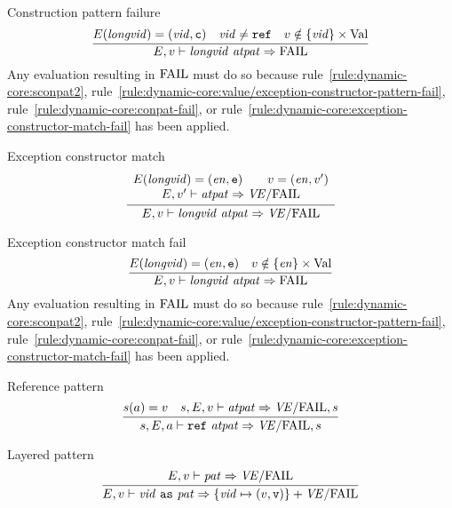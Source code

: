 \begin{inference-rule}{Construction pattern failure}
\begin{equation}\label{rule:dynamic-core:conpat-fail}
\vcenter{\infer{\E,\V\ts\vidpat\ra \FAIL}
  {\E(\longvid) = (\vid,\isc)
    & \vid\neq\REF
    & \V\notin\{\vid\}\times\Val}}
\end{equation}
Any evaluation resulting in ${\rm FAIL}$ must do so because 
rule~\ref{rule:dynamic-core:sconpat2},
rule~\ref{rule:dynamic-core:value/exception-constructor-pattern-fail},
rule~\ref{rule:dynamic-core:conpat-fail},
or rule~\ref{rule:dynamic-core:exception-constructor-match-fail}
has been applied.
\end{inference-rule}

\begin{inference-rule}{Exception constructor match}
\begin{equation}\label{rule:dynamic-core:exception-constructor-match}
\vcenter{\infer{\E,\V\ts\vidpat\ra\VE/\FAIL}
  {\begin{array}{c}
      \E(\longvid)=(\e,\ise)\qquad\V=(\e,\V')\\
      \E,\V'\ts\atpat\ra\VE/\FAIL
      \end{array}
}}
\end{equation}
\end{inference-rule}

\begin{inference-rule}{Exception constructor match fail}
\begin{equation}\label{rule:dynamic-core:exception-constructor-match-fail}
\vcenter{\infer{\E,\V\ts\vidpat\ra\FAIL}
  {\E(\longvid)=(\e,\ise)
    & \V\notin\{\e\}\times\Val}}
\end{equation}
Any evaluation resulting in ${\rm FAIL}$ must do so because 
rule~\ref{rule:dynamic-core:sconpat2},
rule~\ref{rule:dynamic-core:value/exception-constructor-pattern-fail},
rule~\ref{rule:dynamic-core:conpat-fail},
or rule~\ref{rule:dynamic-core:exception-constructor-match-fail}
has been applied.
\end{inference-rule}

\begin{inference-rule}{Reference pattern}
\begin{equation}\label{rule:dynamic-core:reference-pattern}
\vcenter{\infer{\s,\E,\A\ts\REF\ \atpat\ra \VE/\fail,\s}
  {\s(\A)=\V
    & \s,\E,\V\ts\atpat\ra\VE/\fail,\s}}
\end{equation}
\end{inference-rule}

\begin{inference-rule}{Layered pattern}
\begin{equation}\label{rule:dynamic-core:layered-pattern}
\vcenter{\infer{\E,\V\ts\layeredvidpata\ra\{\vid\mapsto(\V,\isv)\}+\VE/\fail}
  {\E,\V\ts\pat\ra\VE/\fail}}
\end{equation}
\end{inference-rule}


